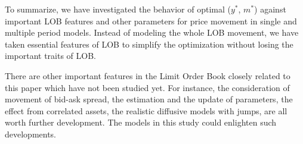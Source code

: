 \documentclass[11pt]{article}
\theoremstyle{plain}
\numberwithin{equation}{section}
\newcommand{\Red}{\color{Red}}
\begin{document}
\par {\Red
To summarize, we have investigated the  behavior of optimal ($y^*$, $m^*$) against important LOB features and other parameters for price movement in single and multiple period models. Instead of modeling the whole LOB movement, we have taken essential features of LOB to simplify the optimization without losing the important traits of LOB. 
}



\par There are other important features in the Limit Order Book closely related to this paper which have not been studied yet. For instance, the consideration of movement of bid-ask spread, the estimation and the update of parameters, the effect from correlated assets, the realistic diffusive models with jumps, are all worth further development. The models in this study could enlighten such developments.


%

\end{document}

